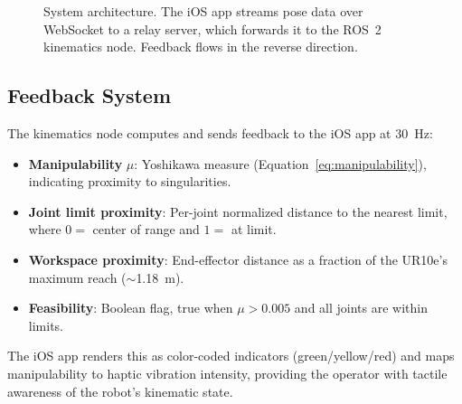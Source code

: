 \begin{figure}[H]
\centering
{}
\caption{System architecture. The iOS app streams pose data over WebSocket to a relay server, which forwards it to the ROS~2 kinematics node. Feedback flows in the reverse direction.}
\label{fig:architecture}
\end{figure}

\subsection{Feedback System}

The kinematics node computes and sends feedback to the iOS app at 30~Hz:
\begin{itemize}
    \item \textbf{Manipulability} $\mu$: Yoshikawa measure (Equation~\ref{eq:manipulability}), indicating proximity to singularities.
    \item \textbf{Joint limit proximity}: Per-joint normalized distance to the nearest limit, where $0 =$ center of range and $1 =$ at limit.
    \item \textbf{Workspace proximity}: End-effector distance as a fraction of the UR10e's maximum reach ($\sim$1.18~m).
    \item \textbf{Feasibility}: Boolean flag, true when $\mu > 0.005$ and all joints are within limits.
\end{itemize}
The iOS app renders this as color-coded indicators (green/yellow/red) and maps manipulability to haptic vibration intensity, providing the operator with tactile awareness of the robot's kinematic state.
